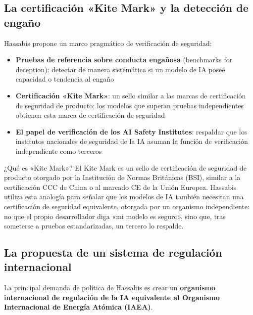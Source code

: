 \documentclass[a4paper]{article}
\begin{document}
\subsection{La certificación «Kite Mark» y la detección de engaño}

Hassabis propone un marco pragmático de verificación de seguridad:

\begin{itemize}
    \item \textbf{Pruebas de referencia sobre conducta engañosa} (benchmarks for deception): detectar de manera sistemática si un modelo de IA posee capacidad o tendencia al engaño
    \item \textbf{Certificación «Kite Mark»}: un sello similar a las marcas de certificación de seguridad de producto; los modelos que superan pruebas independientes obtienen esta marca de certificación de seguridad
    \item \textbf{El papel de verificación de los AI Safety Institutes}: respaldar que los institutos nacionales de seguridad de la IA asuman la función de verificación independiente como terceros
\end{itemize}

\begin{knowledgebox}{¿Qué es «Kite Mark»?}
El Kite Mark es un sello de certificación de seguridad de producto otorgado por la Institución de Normas Británicas (BSI), similar a la certificación CCC de China o al marcado CE de la Unión Europea. Hassabis utiliza esta analogía para señalar que los modelos de IA también necesitan una certificación de seguridad equivalente, otorgada por un organismo independiente: no que el propio desarrollador diga «mi modelo es seguro», sino que, tras someterse a pruebas estandarizadas, un tercero lo respalde.
\end{knowledgebox}

\subsection{La propuesta de un sistema de regulación internacional}

La principal demanda de política de Hassabis es crear un \textbf{organismo internacional de regulación de la IA equivalente al Organismo Internacional de Energía Atómica (IAEA)}.
\end{document}
